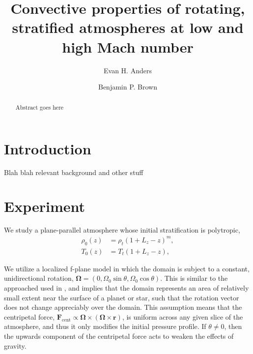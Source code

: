 \documentclass[aps, prl, twocolumn, nofootinbib, groupedaddress, amsfonts, amssymb, amsmath]{revtex4-1}
\begin{document}
\author{Evan H. Anders}
\author{Benjamin P. Brown}
\title{Convective properties of rotating, stratified atmospheres at low and high Mach number}

\begin{abstract}
Abstract goes here
\end{abstract}
\maketitle


\section{Introduction}
\label{sec:intro}
Blah blah relevant background and other stuff

\section{Experiment} 
\label{sec:experiment}
We study a plane-parallel atmosphere whose initial stratification is polytropic,
\begin{equation}
\begin{split}
\rho_0(z) &= \rho_{t}(1 + L_z - z)^m, \\
T_0(z)    &= T_{t}(1 + L_z - z),
\label{eqn:polytrope}
\end{split}
\end{equation}

We utilize a localized f-plane model in which the domain
is subject to a constant, unidirectional rotation, 
$\bm{\Omega} = (0, \Omega_0 \sin\theta, \Omega_0\cos\theta)$.
This is similar to the approached used in \cite{brummell&all1996}, and
implies that the domain represents an area of relatively small extent near
the surface of a planet or star, such that the rotation vector does not
change appreciably over the domain.  This assumption means that
the centripetal force, 
$\bm{F}_{\text{cent}} \propto \bm{\Omega}\times(\bm{\Omega}\times\bm{r})$,
is uniform across any given slice of the atmosphere, and thus it only modifies the
initial pressure profile.  If $\theta \neq 0$, then the upwards component of the
centripetal force acts to weaken the effects of gravity.
\end{document}

